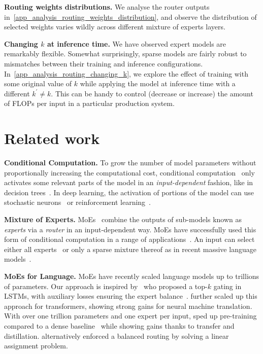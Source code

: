 \documentclass{article}
\begin{document}
\textbf{Routing weights distributions.}
We analyse the router outputs in~\cref{app_analysis_routing_weights_distribution}, and observe the distribution of selected weights varies wildly across different mixture of experts layers.

\textbf{Changing $k$ at inference time.}
We have observed expert models are remarkably flexible.
Somewhat surprisingly, sparse models are fairly robust to mismatches between their training and inference configurations.
In~\cref{app_analysis_routing_changing_k}, we explore the effect of training with some original value of $k$ while applying the model at inference time with a different $k^\prime \neq k$.
This can be handy to control (decrease or increase) the amount of FLOPs per input in a particular production system. \section{Related work}

\textbf{Conditional Computation.} To grow the number of model parameters without proportionally increasing the computational cost, conditional computation~\cite{bengio2013deep,davis2013low,cho2014exponentially} only activates some relevant parts of the model in an \textit{input-dependent} fashion, like in decision trees~\cite{breiman1984classification}.
In deep learning,
the activation of portions of the model can use stochastic neurons~\cite{bengio2013estimating} or reinforcement learning~\cite{bengio2015conditional, denoyer2014deep, rosenbaum2017routing}.

\textbf{Mixture of Experts.} 
MoEs~\cite{jacobs1991adaptive, jordan1994hierarchical, chen1999improved, yuksel2012twenty} combine the outputs of sub-models known as \textit{experts} via a \textit{router} in an input-dependent way. MoEs have successfully used this form of conditional computation in a range of applications~\cite{gavrila2007multi, hu1997patient, tani1999learning, sminchisescu2004learning, zeevi1997time}. An input can select either all experts~\cite{eigen2013learning} or only a sparse mixture thereof as in recent massive language models~\cite{shazeer2017outrageously, lepikhin2020gshard, fedus2021switch}.

\textbf{MoEs for Language.}
MoEs have recently scaled language models up to trillions of parameters. 
Our approach is inspired by~\cite{shazeer2017outrageously} who proposed a top-$k$ gating in LSTMs, with auxiliary losses ensuring the expert balance~\cite{hansen1999combining}. \cite{lepikhin2020gshard} further scaled up this approach for transformers, showing strong gains for neural machine translation. With over one trillion parameters and one expert per input, \cite{fedus2021switch} sped up pre-training compared to a dense baseline~\cite{raffel2019exploring} while showing gains thanks to transfer and distillation. \cite{lewis2021base} alternatively enforced a balanced routing by solving a linear assignment problem.
\end{document}
